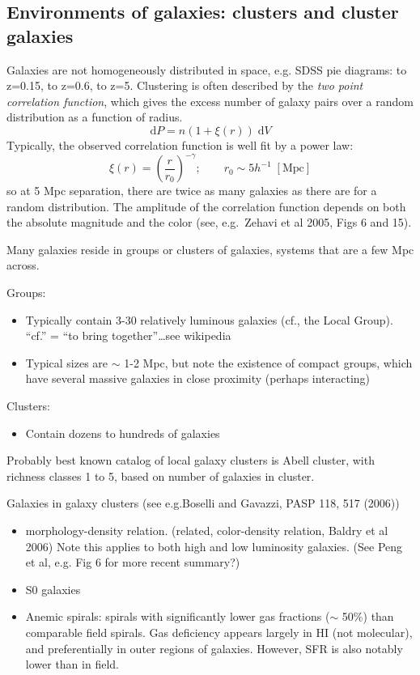 \documentclass{article}
\newcommand{\mynotes}[1]{\textcolor{cadmiumgreen}{#1}}
\begin{document}
\subsection{Environments of galaxies: clusters and cluster galaxies}
Galaxies are not homogeneously distributed in space, e.g. SDSS pie diagrams: to
z=0.15, to z=0.6, to z=5. Clustering is often described by the \textit{two
point correlation function}, which gives the excess number of galaxy pairs over
a random distribution as a function of radius.
\[
    \mathrm{d}P = n \left( 1 + \xi(r) \right) \;\mathrm{d}V
    \]
Typically, the observed correlation function is well fit by a power law:
\[
    \xi(r) = \left( \frac{r}{r_{0}} \right)^{-\gamma}; \qquad
    r_{0} \sim 5h^{-1}\; [\mathrm{Mpc}]
    \]
so at 5 Mpc separation, there are twice as many galaxies as there are for a
random distribution. The amplitude of the correlation function depends on
both the absolute magnitude and the color (see, e.g.\
Zehavi et al 2005, Figs 6 and 15).

Many galaxies reside in groups or clusters of galaxies, systems that are a few
Mpc across.

Groups:
\begin{itemize}
    \item Typically contain 3-30 relatively luminous galaxies (cf., the Local
        Group). \mynotes{``cf.'' = ``to bring together''\ldots see wikipedia}
    \item Typical sizes are $\sim$ 1-2 Mpc, but note the existence of compact
        groups, which have several massive galaxies in close proximity (perhaps
        interacting)
\end{itemize}

Clusters:
\begin{itemize}
    \item Contain dozens to hundreds of galaxies
\end{itemize}

Probably best known catalog of local galaxy clusters is Abell cluster, with richness classes 1 to 5, based on number of galaxies in cluster.

Galaxies in galaxy clusters (see e.g.Boselli and Gavazzi, PASP 118, 517 (2006))
\begin{itemize}
    \item morphology-density relation. (related, color-density relation, Baldry
        et al 2006) Note this applies to both high and low luminosity galaxies.
        (See Peng et al, e.g. Fig 6 for more recent summary?)
    \item S0 galaxies
    \item Anemic spirals: spirals with significantly lower gas fractions
        ($\sim$ 50\%) than comparable field spirals. Gas deficiency appears
        largely in HI (not molecular), and preferentially in outer regions of
        galaxies. However, SFR is also notably lower than in field.
\end{itemize}
\end{document}
